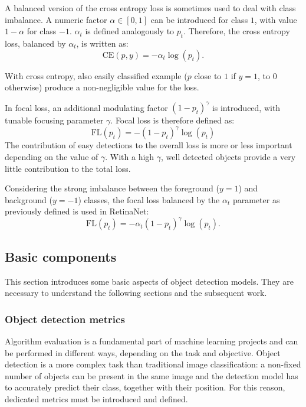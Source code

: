 \documentclass[%
    corpo=12pt,
    twoside,
    stile=classica,   
    tipotesi=magistrale,
    evenboxes,
    english,
	numerazioneromana,
]{toptesi}
\begin{document}
\bigskip
A balanced version of the cross entropy loss is sometimes used to deal with class imbalance. A numeric factor $\alpha\in\left[0,1\right]$ can be introduced for class $1$, with value $1-\alpha$ for class $-1$. $\alpha_t$ is defined analogously to $p_t$. Therefore, the cross entropy loss, balanced by $\alpha_t$, is written as:
\begin{equation}
	\text{CE}(p,y) = -\alpha_t\log(p_t).
\end{equation}

\bigskip
With cross entropy, also easily classified example ($p$ close to $1$ if $y=1$, to $0$ otherwise) produce a non-negligible value for the loss.

In focal loss, an additional modulating factor $\left(1-p_t\right)^\gamma$ is introduced, with tunable focusing parameter $\gamma$. Focal loss is therefore defined as:
\begin{equation}
	\text{FL}(p_t) = -\left(1-p_t\right)^\gamma \log(p_t)
\end{equation}
The contribution of easy detections to the overall loss is more or less important depending on the value of $\gamma$. With a high $\gamma$, well detected objects provide a very little contribution to the total loss.

Considering the strong imbalance between the foreground ($y=1$) and background ($y=-1$) classes, the focal loss balanced by the $\alpha_t$ parameter as previously defined is used in RetinaNet:
\begin{equation}
	\text{FL}(p_t) = -\alpha_t\left(1-p_t\right)^\gamma \log(p_t).
	\label{eq:focalloss}
\end{equation}

\subsection{Basic components}

This section introduces some basic aspects of object detection models. They are necessary to understand the following sections and the subsequent work.

\subsubsection{Object detection metrics}
Algorithm evaluation is a fundamental part of machine learning projects and can be performed in different ways, depending on the task and objective. Object detection is a more complex task than traditional image classification: a non-fixed number of objects can be present in the same image and the detection model has to accurately predict their class, together with their position. For this reason, dedicated metrics must be introduced and defined.
\end{document}
